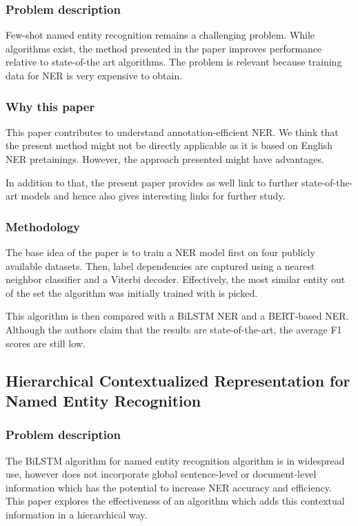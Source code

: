 \documentclass[11pt]{article}
\begin{document}
\subsubsection{Problem description}
Few-shot named entity recognition remains a challenging problem. While algorithms exist, the method presented in the paper improves performance relative to state-of-the art algorithms. The problem is relevant because training data for NER is very expensive to obtain. 

\subsubsection{Why this paper}
This paper contributes to understand annotation-efficient NER. We think that the present method might not be directly applicable as it is based on English NER pretainings. However, the approach presented might have advantages. 

In addition to that, the present paper provides as well link to further state-of-the-art models and hence also gives interesting links for further study. 

\subsubsection{Methodology}
The base idea of the paper is to train a NER model first on four publicly available datasets. Then, label dependencies are captured using a nearest neighbor classifier and a Viterbi decoder. Effectively, the most similar entity out of the set the algorithm was initially trained with is picked. 

This algorithm is then compared with a BiLSTM NER and a BERT-based NER. Although the authors claim that the results are state-of-the-art, the average F1 scores are still low. 


\subsection{Hierarchical Contextualized Representation for Named Entity Recognition
\citet{DBLP:journals/corr/abs-1911-02257} }

\subsubsection{Problem description}

The BiLSTM algorithm for named entity recognition algorithm is in widespread use, however does not incorporate global sentence-level or document-level information which has the potential to increase NER accuracy and efficiency. This paper explores the effectiveness of an algorithm which adds this contextual information in a hierarchical way. 
\end{document}
